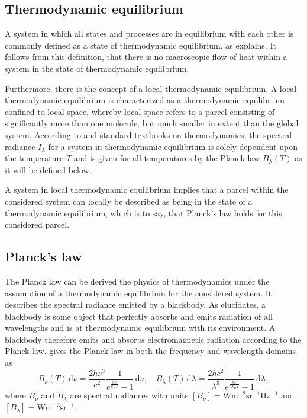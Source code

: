 \documentclass[a4paper,11pt]{report}
\def\fc#1{{\color{black}{#1}}} %
\begin{document}
\subsection{Thermodynamic equilibrium}
A system in which all states and processes are in equilibrium with each other is commonly defined as a state of thermodynamic equilibrium, as \cite[p.41]{Rutten.2015} explains. It follows from this definition, that there is no macroscopic flow of heat within a system in the state of thermodynamic equilibrium.

Furthermore, there is the concept of a local thermodynamic equilibrium. A local thermodynamic equilibrium is characterized as a thermodynamic equilibrium confined to local space, whereby local space refers to a parcel consisting of significantly more than one molecule, but much smaller in extent than the global system. According to \cite[p.41-42]{Rutten.2015} and standard textbooks on thermodynamics, the spectral radiance $I_\lambda$ for a system in thermodynamic equilibrium is solely dependent upon the temperature $T$ and is given for all temperatures by the Planck law $B_\lambda(T)$ as it will be defined below.

A system in local thermodynamic equilibrium implies that a parcel within the considered system can locally be described as being in the state of a thermodynamic equilibrium, which is to say, that Planck's law holds for this considered parcel.

\subsection{Planck's law}
The Planck law can be derived \fc{examining} the physics of thermodynamics under the assumption of a thermodynamic equilibrium for the considered system. It describes the spectral radiance emitted by a blackbody. As \cite[p.9-10]{Liou.2002} elucidates, a blackbody is some object that perfectly absorbs and emits radiation of all wavelengths and is at thermodynamic equilibrium with its environment. A blackbody therefore emits and absorbs electromagnetic radiation according to the Planck law. \cite[p.42]{Rutten.2015} gives the Planck law in both the frequency and wavelength domains as
\begin{equation}\label{eq:Plancklaw}
B_\nu(T)\,\mathrm{d}\nu = \frac{2h\nu^3}{c^2}\frac{1}{e^{\frac{h\nu}{k_BT}}-1}\,\mathrm{d}\nu, \quad B_\lambda(T)\,\mathrm{d}\lambda = \frac{2hc^2}{\lambda^5}\frac{1}{e^{\frac{hc}{\lambda k_B T}}-1}\,\mathrm{d}\lambda,
\end{equation} where $B_\nu$ and $B_\lambda$ are spectral radiances with units $[B_\nu] = \si{\watt\meter^{-2}\steradian^{-1}\hertz^{-1}}$ and $[B_\lambda] = \si{\watt\meter^{-3}\steradian^{-1}}$.
\end{document}
